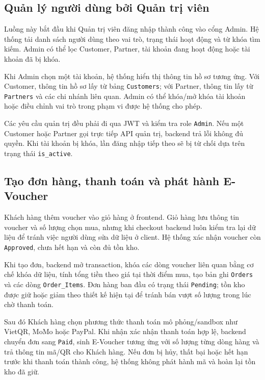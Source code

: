 \subsection{Quản lý người dùng bởi Quản trị viên}

Luồng này bắt đầu khi Quản trị viên đăng nhập thành công vào cổng Admin. Hệ thống tải danh sách người dùng theo vai trò, trạng thái hoạt động và từ khóa tìm kiếm. Admin có thể lọc Customer, Partner, tài khoản đang hoạt động hoặc tài khoản đã bị khóa.

Khi Admin chọn một tài khoản, hệ thống hiển thị thông tin hồ sơ tương ứng. Với Customer, thông tin hồ sơ lấy từ bảng \texttt{Customers}; với Partner, thông tin lấy từ \texttt{Partners} và các chi nhánh liên quan. Admin có thể khóa/mở khóa tài khoản hoặc điều chỉnh vai trò trong phạm vi được hệ thống cho phép.

Các yêu cầu quản trị đều phải đi qua JWT và kiểm tra role \texttt{Admin}. Nếu một Customer hoặc Partner gọi trực tiếp API quản trị, backend trả lỗi không đủ quyền. Khi tài khoản bị khóa, lần đăng nhập tiếp theo sẽ bị từ chối dựa trên trạng thái \texttt{is\_active}.

\subsection{Tạo đơn hàng, thanh toán và phát hành E-Voucher}

Khách hàng thêm voucher vào giỏ hàng ở frontend. Giỏ hàng lưu thông tin voucher và số lượng chọn mua, nhưng khi checkout backend luôn kiểm tra lại dữ liệu để tránh việc người dùng sửa dữ liệu ở client. Hệ thống xác nhận voucher còn \texttt{Approved}, chưa hết hạn và còn đủ tồn kho.

Khi tạo đơn, backend mở transaction, khóa các dòng voucher liên quan bằng cơ chế khóa dữ liệu, tính tổng tiền theo giá tại thời điểm mua, tạo bản ghi \texttt{Orders} và các dòng \texttt{Order\_Items}. Đơn hàng ban đầu có trạng thái \texttt{Pending}; tồn kho được giữ hoặc giảm theo thiết kế hiện tại để tránh bán vượt số lượng trong lúc chờ thanh toán.

Sau đó Khách hàng chọn phương thức thanh toán mô phỏng/sandbox như VietQR, MoMo hoặc PayPal. Khi nhận xác nhận thanh toán hợp lệ, backend chuyển đơn sang \texttt{Paid}, sinh E-Voucher tương ứng với số lượng từng dòng hàng và trả thông tin mã/QR cho Khách hàng. Nếu đơn bị hủy, thất bại hoặc hết hạn trước khi thanh toán thành công, hệ thống không phát hành mã và hoàn lại tồn kho đã giữ.

